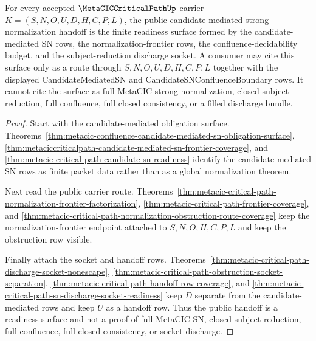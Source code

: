 \begin{theorem}
\label{thm:metaciccriticalpath-candidate-mediated-sn-public}
For every accepted $\MetaCICCriticalPathUp$ carrier $K=(S,N,O,U,D,H,C,P,L)$, the public candidate-mediated strong-normalization handoff is the finite readiness surface formed by the candidate-mediated SN rows, the normalization-frontier rows, the confluence-decidability budget, and the subject-reduction discharge socket. A consumer may cite this surface only as a route through $S,N,O,U,D,H,C,P,L$ together with the displayed CandidateMediatedSN and CandidateSNConfluenceBoundary rows. It cannot cite the surface as full MetaCIC strong normalization, closed subject reduction, full confluence, full closed consistency, or a filled discharge bundle.
\end{theorem}
\begin{proof}
Start with the candidate-mediated obligation surface. Theorems~\ref{thm:metacic-confluence-candidate-mediated-sn-obligation-surface}, \ref{thm:metaciccriticalpath-candidate-mediated-sn-frontier-coverage}, and \ref{thm:metacic-critical-path-candidate-sn-readiness} identify the candidate-mediated SN rows as finite packet data rather than as a global normalization theorem.

Next read the public carrier route. Theorems~\ref{thm:metacic-critical-path-normalization-frontier-factorization}, \ref{thm:metacic-critical-path-frontier-coverage}, and \ref{thm:metacic-critical-path-normalization-obstruction-route-coverage} keep the normalization-frontier endpoint attached to $S,N,O,H,C,P,L$ and keep the obstruction row visible.

Finally attach the socket and handoff rows. Theorems~\ref{thm:metacic-critical-path-discharge-socket-nonescape}, \ref{thm:metacic-critical-path-obstruction-socket-separation}, \ref{thm:metacic-critical-path-handoff-row-coverage}, and \ref{thm:metacic-critical-path-sn-discharge-socket-readiness} keep $D$ separate from the candidate-mediated rows and keep $U$ as a handoff row. Thus the public handoff is a readiness surface and not a proof of full MetaCIC SN, closed subject reduction, full confluence, full closed consistency, or socket discharge.
\end{proof}

